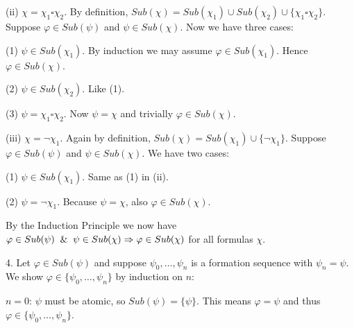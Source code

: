 \documentclass[a4paper,11pt]{article}
\begin{document}
\begin{description}
\begin{description}
\item{(ii)} $\chi = \chi_{1} \square \chi_{2}$. By definition,
$Sub(\chi) = Sub(\chi_{1}) \cup Sub(\chi_{2}) \cup \{\chi_{1} \square \chi_{2}\}$.
Suppose $\varphi \in Sub(\psi)$ and $\psi \in Sub(\chi)$. Now we have three
cases:
  \begin{description}
    \item{(1)} $\psi \in Sub(\chi_{1})$. By induction we may assume
      $\varphi \in Sub(\chi_{1})$. Hence $\varphi \in Sub(\chi)$.
    \item{(2)} $\psi \in Sub(\chi_{2})$. Like (1).
    \item{(3)} $\psi = \chi_{1} \square \chi_{2}$. Now $\psi = \chi$
      and trivially $\varphi \in Sub(\chi)$.
  \end{description}

\item{(iii)} $\chi = \neg \chi_{1}$. Again by definition,
$Sub(\chi) = Sub(\chi_{1}) \cup \{\neg \chi_{1}\}$. Suppose $\varphi \in Sub(\psi)$
and $\psi \in Sub(\chi)$. We have two cases:
  \begin{description}
    \item{(1)} $\psi \in Sub(\chi_{1})$. Same as (1) in (ii).
    \item{(2)} $\psi = \neg \chi_{1}$. Because $\psi = \chi$, also
      $\varphi \in Sub(\chi)$.
  \end{description}

\end{description}

By the Induction Principle we now have
$\varphi \in Sub(\psi) \And \psi \in Sub(\chi) \Rightarrow \varphi \in Sub(\chi)$
for all formulas $\chi$.

\item{4.}
Let $\varphi \in Sub(\psi)$ and suppose $\psi_{0}, \ldots, \psi_{n}$ is a
formation sequence with $\psi_{n} = \psi$. We show
$\varphi \in \{\psi_{0}, \ldots, \psi_{n}\}$ by induction on $n$:
\begin{description}
\item{$n = 0$:} $\psi$ must be atomic, so $Sub(\psi) = \{\psi\}$. This
means $\varphi = \psi$ and thus $\varphi \in \{\psi_{0}, \ldots, \psi_{n}\}$.


\end{description}
\end{description}
\end{document}
